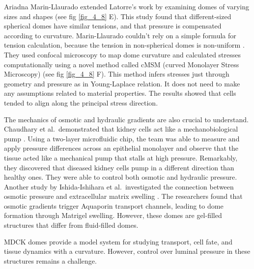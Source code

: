 Ariadna Marin-Llaurado extended Latorre's work by examining domes of varying sizes and shapes (see fig \ref{fig_4_8} E). This study found that different-sized spherical domes have similar tensions, and that pressure is compensated according to curvature. Marin-Llaurado couldn't rely on a simple formula for tension calculation, because the tension in non-spherical domes is non-uniform \cite{marin-llaurado2022}. They used confocal microscopy to map dome curvature and calculated stresses computationally using a novel method called cMSM (curved Monolayer Stress Microscopy) (see fig \ref{fig_4_8} F). This method infers stresses just through geometry and pressure as in Young-Laplace relation. It does not need to make any assumptions related to material properties. The results showed that cells tended to align along the principal stress direction.

The mechanics of osmotic and hydraulic gradients are also crucial to understand. Chaudhary et al.~demonstrated that kidney cells act like a mechanobiological pump \cite{choudhury2022}. Using a two-layer microfluidic chip, the team was able to measure and apply pressure differences across an epithelial monolayer and observe that the tissue acted like a mechanical pump that stalls at high pressure. Remarkably, they discovered that diseased kidney cells pump in a different direction than healthy ones. They were able to control both osmotic and hydraulic pressure. Another study by Ishida-Ishihara et al.~investigated the connection between osmotic pressure and extracellular matrix swelling \cite{ishida-ishihara2020}. The researchers found that osmotic gradients trigger Aquaporin transport channels, leading to dome formation through Matrigel swelling. However, these domes are gel-filled structures that  differ from fluid-filled domes.

MDCK domes provide a model system for studying transport, cell fate, and tissue dynamics with a curvature. However, control over luminal pressure in these structures remains a challenge.
